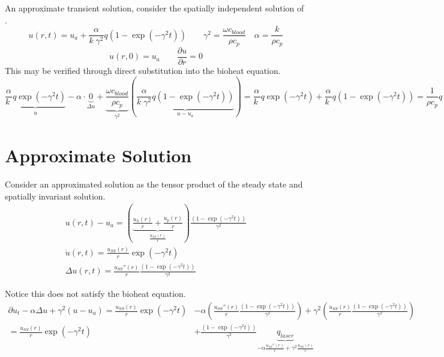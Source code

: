 \documentclass{article}         %
\theoremstyle{definition}
\theoremstyle{remark}
\begin{document}
An approximate transient solution, consider the spatially independent
solution of \cite{Giordano2010}.
\[
 u(r,t) = u_a + \frac{\alpha}{k\; \gamma^2} q \left( 1 - \exp(-\gamma^2 t)\right)
 \qquad
  \gamma^2 = \frac{\omega c_\textit{blood}}{\rho c_p}
 \quad
  \alpha  = \frac{k}{\rho c_p}
\]
\[
 u(r,0) = u_a 
 \qquad
 \frac{\partial u}{\partial r} = 0 
\]
This may be verified through direct substitution into the bioheat equation.
\[
 \underbrace{\frac{\alpha}{k\; } q  \exp(-\gamma^2 t)}_{\dot{u} }
 -  \alpha  \cdot
\underbrace{ 0}_{\Delta u }
 + 
\underbrace{ 
  \frac{\omega c_\textit{blood}}{\rho c_p} 
  }_{\gamma^2 }
  \left(
 \underbrace{
  \frac{\alpha}{k\; \gamma^2} q \left( 1 - \exp(-\gamma^2 t)\right)
   }_{u  - u_a }
   \right)
  = 
 \frac{\alpha}{k\; } q  \exp(-\gamma^2 t)
  +
 \frac{\alpha}{k\; } q 
      \left( 1 - \exp(-\gamma^2 t)\right)
  = 
 \frac{1}{\rho c_p } q 
\]

\section{Approximate Solution}

Consider an approximated solution as the tensor product of the steady state
and spatially invariant solution.
\begin{equation} \label{AssumedAnalyticForm}
\begin{split}
 u(r,t) - u_a = 
 \left(
 \underbrace{
 \frac{u_h(r)}{r} +
 \frac{u_p(r)}{r}
  }_{
 \frac{u_{SS}(r)}{r}
  }
 \right)
 \frac{\left( 1 - \exp(-\gamma^2 t)\right)}{ \gamma^2}  
\\
 \dot{u}(r,t)  =  
 \frac{u_{SS}(r)}{r}  \exp(-\gamma^2 t)
\\
 \Delta u(r,t)  = 
 \frac{u_{SS}''(r)}{r} 
 \frac{\left( 1 - \exp(-\gamma^2 t)\right)}{ \gamma^2}  
\end{split}
\end{equation}

Notice this does not satisfy the bioheat equation.
\[
\begin{split}
  \partial u_t   
 - \alpha \Delta u   
 +  \gamma^2 (u  - u_a )
  = 
  \frac{u_{SS}(r)}{r}  \exp(-\gamma^2 t)
 & - 
  \alpha
  \left(
 \frac{u_{SS}''(r)}{r} 
 \frac{\left( 1 - \exp(-\gamma^2 t)\right)}{ \gamma^2}  
  \right)
  + 
  \gamma^2
  \left(
  \frac{u_{SS}(r)}{r} 
 \frac{\left( 1 - \exp(-\gamma^2 t)\right)}{ \gamma^2}  
  \right)
\\
  = 
   \frac{u_{SS}(r)}{r}  \exp(-\gamma^2 t)
 &+
 \frac{\left( 1 - \exp(-\gamma^2 t)\right)}{ \gamma^2}  
 \underbrace{q_\textit{laser}}_{
  -\alpha \frac{u_{SS}''(r)}{r} 
  + \gamma^2
  \frac{u_{SS}(r)}{r} 
  }
\end{split}
\]
\end{document}
